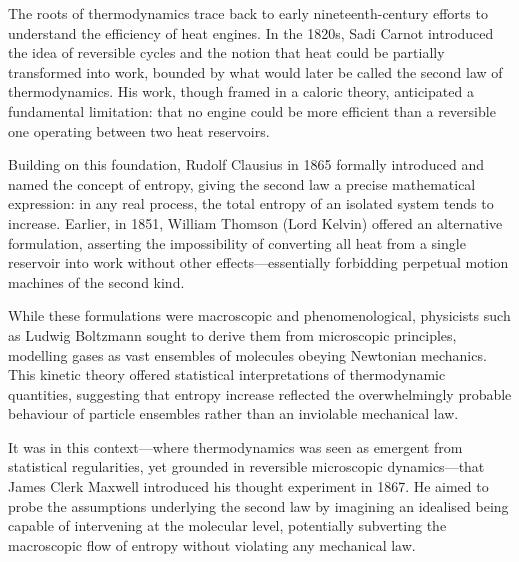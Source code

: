 \begin{historical}
The roots of thermodynamics trace back to early nineteenth-century efforts to understand the efficiency of heat engines. In the 1820s, Sadi Carnot introduced the idea of reversible cycles and the notion that heat could be partially transformed into work, bounded by what would later be called the second law of thermodynamics. His work, though framed in a caloric theory, anticipated a fundamental limitation: that no engine could be more efficient than a reversible one operating between two heat reservoirs.

Building on this foundation, Rudolf Clausius in 1865 formally introduced and named the concept of entropy, giving the second law a precise mathematical expression: in any real process, the total entropy of an isolated system tends to increase. Earlier, in 1851, William Thomson (Lord Kelvin) offered an alternative formulation, asserting the impossibility of converting all heat from a single reservoir into work without other effects—essentially forbidding perpetual motion machines of the second kind.

While these formulations were macroscopic and phenomenological, physicists such as Ludwig Boltzmann sought to derive them from microscopic principles, modelling gases as vast ensembles of molecules obeying Newtonian mechanics. This kinetic theory offered statistical interpretations of thermodynamic quantities, suggesting that entropy increase reflected the overwhelmingly probable behaviour of particle ensembles rather than an inviolable mechanical law.

It was in this context—where thermodynamics was seen as emergent from statistical regularities, yet grounded in reversible microscopic dynamics—that James Clerk Maxwell introduced his thought experiment in 1867. He aimed to probe the assumptions underlying the second law by imagining an idealised being capable of intervening at the molecular level, potentially subverting the macroscopic flow of entropy without violating any mechanical law.
\end{historical}
